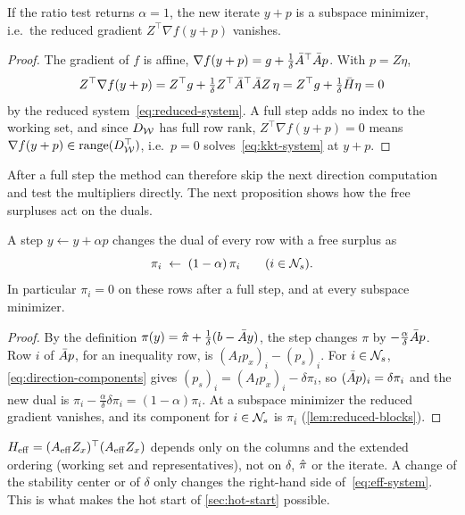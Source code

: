 \begin{prop} \label{prop:full-step}
If the ratio test returns $\alpha = 1$, the new iterate $y+p$ is a subspace minimizer, i.e.\
the reduced gradient $Z^\top\nabla f(y+p)$ vanishes.
\end{prop}

\begin{proof}
The gradient of $f$ is affine, $\nabla f(y + p) = g + \frac{1}{\delta}\bar{A}^\top\bar{A} p$. With
$p = Z\eta$,
\[
Z^\top\nabla f(y+p) = Z^\top g + \tfrac{1}{\delta}Z^\top\bar{A}^\top\bar{A} Z\,\eta
= Z^\top g + \tfrac{1}{\delta}\bar{H}\eta = 0
\]
by the reduced system~\eqref{eq:reduced-system}. A full step adds no index to the working set,
and since $D_{\mathcal{W}}$ has full row rank, $Z^\top\nabla f(y+p) = 0$ means
$\nabla f(y+p)\in\operatorname{range}(D_{\mathcal{W}}^\top)$, i.e.\ $p = 0$ solves~\eqref{eq:kkt-system}
at $y + p$.
\end{proof}

After a full step the method can therefore skip the next direction computation and test the
multipliers directly. The next proposition shows how the free surpluses act on the duals.

\begin{prop} \label{prop:free-duals}
A step $y\gets y + \alpha p$ changes the dual of every row with a free surplus as
\[
\pi_i\;\gets\;(1-\alpha)\,\pi_i\qquad(i\in\mathcal{N}_s).
\]
In particular $\pi_i = 0$ on these rows after a full step, and at every subspace minimizer.
\end{prop}

\begin{proof}
By the definition $\pi(y) = \hat{\pi} + \frac{1}{\delta}(b - \bar{A} y)$, the step changes $\pi$ by
$-\frac{\alpha}{\delta}\bar{A} p$. Row $i$ of $\bar{A} p$, for an inequality row, is
$(A_Ip_x)_i - (p_s)_i$. For $i\in\mathcal{N}_s$, \eqref{eq:direction-components} gives
$(p_s)_i = (A_Ip_x)_i - \delta\pi_i$, so $(\bar{A} p)_i = \delta\pi_i$ and the new dual is
$\pi_i - \frac{\alpha}{\delta}\delta\pi_i = (1-\alpha)\pi_i$. At a subspace minimizer the
reduced gradient vanishes, and its component for $i\in\mathcal{N}_s$ is $\pi_i$ (\cref{lem:reduced-blocks}).
\end{proof}

\begin{remark} \label{rem:factor-independent}
$H_{\mathrm{eff}} = (A_{\mathrm{eff}} Z_x)^\top(A_{\mathrm{eff}} Z_x)$ depends only on the columns and the extended ordering
(working set and representatives), not on
$\delta$, $\hat{\pi}$ or the iterate. A change of the stability center or of $\delta$ only changes
the right-hand side of~\eqref{eq:eff-system}. This is what makes the hot start of
\cref{sec:hot-start} possible.
\end{remark}

